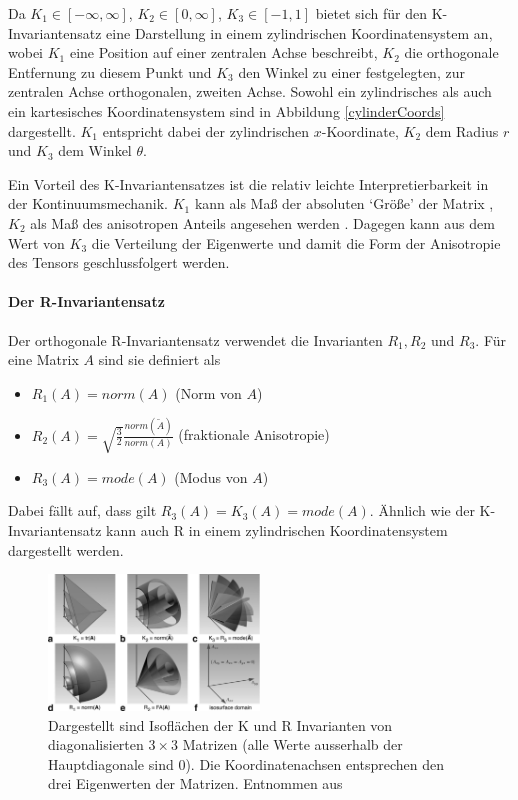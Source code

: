 \documentclass[a4paper,fontsize=12pt,toc=bib,halfparskip]{scrartcl}
\begin{document}
Da $K_1 \in [-\infty, \infty]$, $K_2 \in [0,\infty]$, $K_3 \in [-1,1]$ bietet sich f\"ur den K-Invariantensatz eine Darstellung in einem zylindrischen Koordinatensystem an, wobei $K_1$ eine Position auf einer zentralen Achse beschreibt, $K_2$ die orthogonale Entfernung zu diesem Punkt und $K_3$ den Winkel zu einer festgelegten, zur zentralen Achse orthogonalen, zweiten Achse. Sowohl ein zylindrisches als auch ein kartesisches Koordinatensystem sind in Abbildung \ref{cylinderCoords} dargestellt. $K_1$ entspricht dabei der zylindrischen $x$-Koordinate, $K_2$ dem Radius $r$ und $K_3$ dem Winkel $\theta$.

Ein Vorteil des K-Invariantensatzes ist die relativ leichte Interpretierbarkeit in der Kontinuumsmechanik. $K_1$ kann als Ma{\ss} der absoluten `Gr\"o{\ss}e' der Matrix , $K_2$ als Ma{\ss} des anisotropen Anteils angesehen werden \cite{kindlmann2007diffusion}. Dagegen kann aus dem Wert von $K_3$ die Verteilung der Eigenwerte und damit die Form der Anisotropie des Tensors geschlussfolgert werden.



\paragraph{Der R-Invariantensatz}
Der orthogonale R-Invariantensatz verwendet die Invarianten $R_1, R_2$ und $R_3$. F\"ur eine Matrix $A$ sind sie definiert als

\begin{itemize}
	\item $R_1(A)=norm(A)$ (Norm von $A$)
	\item $R_2(A)=\sqrt{\frac{3}{2}} \frac{norm(\tilde{A})}{norm(A)}$ (fraktionale Anisotropie)
	\item $R_3(A)=mode(A)$ (Modus von $A$)
\end{itemize}

Dabei f\"allt auf, dass gilt $R_3(A) = K_3(A) = mode(A)$. \"Ahnlich wie der K-Invariantensatz kann auch R in einem zylindrischen Koordinatensystem dargestellt werden.

\begin{figure}
	\centering
	\includegraphics[width=0.5\textwidth]{pictures/-000.png}
	\caption{Dargestellt sind Isofl\"achen der K und R Invarianten von diagonalisierten $3\times 3$ Matrizen (alle Werte ausserhalb der Hauptdiagonale sind 0). Die Koordinatenachsen entsprechen den drei Eigenwerten der Matrizen. Entnommen aus \cite[S.~139]{ennis2006orthogonal}}
	\label{KRInvariants}
\end{figure}
\end{document}
